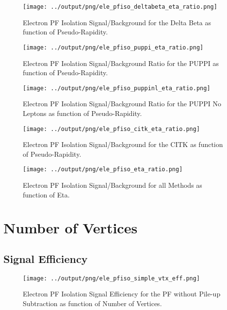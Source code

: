 \documentclass[11pt]{book}
\begin{document}
\begin{figure}[htb]
\centering
\texttt{[image: ../output/png/ele\_pfiso\_deltabeta\_eta\_ratio.png]}
\caption{Electron PF Isolation Signal/Background for the Delta Beta as function of Pseudo-Rapidity.}
\label{fig:ele_pfiso_eta_ratio_deltabeta}
\end{figure}

\begin{figure}[htb]
\centering
\texttt{[image: ../output/png/ele\_pfiso\_puppi\_eta\_ratio.png]}
\caption{Electron PF Isolation Signal/Background Ratio for the PUPPI as function of Pseudo-Rapidity.}
\label{fig:ele_pfiso_eta_ratio_puppi}
\end{figure}


\begin{figure}[htb]
\centering
\texttt{[image: ../output/png/ele\_pfiso\_puppinl\_eta\_ratio.png]}
\caption{Electron PF Isolation Signal/Background Ratio for the PUPPI No Leptons as function of Pseudo-Rapidity.}
\label{fig:ele_pfiso_eta_ratio_puppinl}
\end{figure}

\begin{figure}[htb]
\centering
\texttt{[image: ../output/png/ele\_pfiso\_citk\_eta\_ratio.png]}
\caption{Electron PF Isolation Signal/Background for the CITK as function of Pseudo-Rapidity.}
\label{fig:ele_pfiso_eta_ratio_citk}
\end{figure}

\begin{figure}[htb]
\centering
\texttt{[image: ../output/png/ele\_pfiso\_eta\_ratio.png]}
\caption{Electron PF Isolation Signal/Background for all Methods as function of Eta.}
\label{fig:ele_pfiso_eta_ratio}
\end{figure}
\clearpage

\section{Number of Vertices}
\subsection{Signal Efficiency}
\begin{figure}[htb]
\centering
\texttt{[image: ../output/png/ele\_pfiso\_simple\_vtx\_eff.png]}
\caption{Electron PF Isolation Signal Efficiency for the PF without Pile-up Subtraction as function of Number of Vertices.}
\label{fig:ele_pfiso_vtx_eff_simple}
\end{figure}
\end{document}
